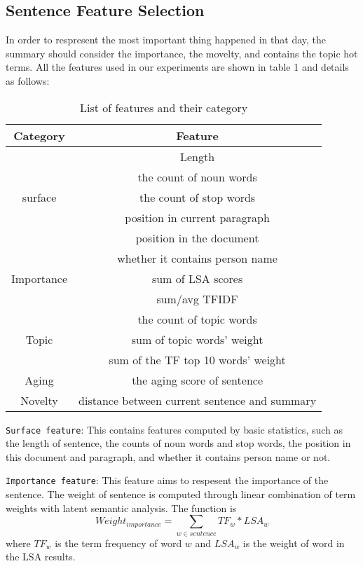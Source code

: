 \documentclass{acm_proc_article-sp}
\begin{document}
\subsection{Sentence Feature Selection}

In order to respresent the most important thing happened in that day, the summary should consider the importance, the movelty, and contains the topic hot terms. 
All the features used in our experiments are shown in table 1 and details as follows:

\begin{table}
\centering
\caption{List of features and their category}
\begin{tabular}{c|c}
\hline
Category & Feature\\
\hline
 & Length\\
 & the count of noun words\\
surface & the count of stop words\\
 & position in current paragraph\\
& position in the document\\
 & whether it contains person name\\
\hline
Importance & sum of LSA scores\\
 & sum/avg TFIDF\\
\hline
& the count of topic words\\
Topic & sum of topic words' weight\\
& sum of the TF top 10 words' weight  \\
\hline
Aging & the aging score of sentence\\
\hline 
Novelty & distance between current sentence and summary\\
\hline
 
\end{tabular}
\end{table}

\texttt{Surface feature}: This contains features computed by basic statistics, such as the length of sentence, the counts of noun words and stop words, the position in this document and paragraph, and whether it contains person name or not. %

\texttt{Importance feature}: This feature aims to respesent the importance of the sentence. The weight of sentence is computed through linear combination of term weights with latent semantic analysis. The function is 
\begin{equation}
Weight_{importance} = \sum_{w \in sentence}TF_w * LSA_w
\end{equation}
where $TF_w$ is the term frequency of word $w$ and $LSA_w$ is the weight of word in the LSA results.
\end{document}
